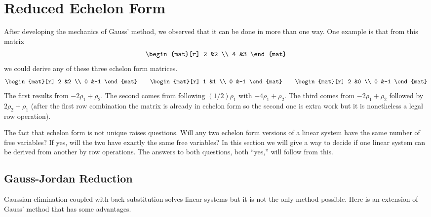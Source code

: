 \section{Reduced Echelon Form}
After developing the mechanics of Gauss' method, 
we observed that it can be done in more than one way.
One example is that from this matrix 
\begin{equation*}
    \begin{mat}[r]
       2  &2  \\
       4  &3
    \end{mat}
\end{equation*}
we could derive any of these three echelon form matrices.
\begin{equation*}
    \begin{mat}[r]
       2  &2  \\
       0  &-1
    \end{mat}
    \qquad
    \begin{mat}[r]
       1  &1  \\
       0  &-1
    \end{mat}
    \qquad
    \begin{mat}[r]
       2  &0  \\
       0  &-1
    \end{mat}
\end{equation*}
The first results from $-2\rho_1+\rho_2$.
The second comes from following $(1/2)\rho_1$ with $-4\rho_1+\rho_2$.
The third comes
from $-2\rho_1+\rho_2$ followed by $2\rho_2+\rho_1$
(after the first row combination the matrix is already in
echelon form so the second one is extra work 
but it is nonetheless a legal row operation).

The fact that echelon form 
is not unique raises questions.
Will any two echelon form versions of a linear system have the same number of
free variables?
If yes, 
will the two have exactly the same free variables?
In this section we will 
give a way to decide if one linear system 
can be derived from another by row operations.
The answers to both questions, both ``yes,''
will follow from this.








\subsection{Gauss-Jordan Reduction}%
Gaussian elimination coupled with back-substitution
solves linear systems but it is not the only method possible.
Here is an extension of Gauss' method that has some advantages.


